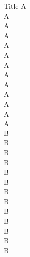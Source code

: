 \documentclass{beamer}
\begin{document}
	\begin{frame}[allowframebreaks]{Title}
	A\\ A\\ A\\ A\\ A\\ A\\ A\\ A\\ A\\ A\\ A\\ A\\ A\\
	\framebreak
	B\\ B\\ B\\ B\\ B\\ B\\ B\\\framebreak B\\ B\\ B\\ B\\ B\\ B\\
\end{frame}
\end{document}
